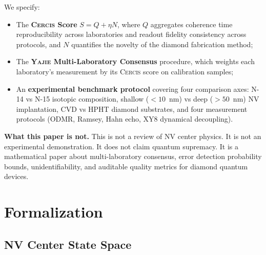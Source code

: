 \documentclass[11pt,a4paper]{article}
\theoremstyle{definition}
\newcommand{\Yajie}{\textsc{Yajie}}
\newcommand{\Cercis}{\textsc{Cercis}}
\newcommand{\NV}{NV}
\newcommand{\ODMR}{ODMR}
\begin{document}
We specify:
\begin{itemize}[nosep]
    \item The \textbf{\Cercis{} Score} $S = Q + \eta N$, where $Q$ aggregates coherence time reproducibility across laboratories and readout fidelity consistency across protocols, and $N$ quantifies the novelty of the diamond fabrication method;
    \item The \textbf{\Yajie{} Multi-Laboratory Consensus} procedure, which weights each laboratory's measurement by its \Cercis{} score on calibration samples;
    \item An \textbf{experimental benchmark protocol} covering four comparison axes: N-14 vs N-15 isotopic composition, shallow ($<10$~nm) vs deep ($>50$~nm) \NV{} implantation, CVD vs HPHT diamond substrates, and four measurement protocols (\ODMR{}, Ramsey, Hahn echo, XY8 dynamical decoupling).
\end{itemize}

\textbf{What this paper is not.} This is not a review of \NV{} center physics. It is not an experimental demonstration. It does not claim quantum supremacy. It is a mathematical paper about multi-laboratory consensus, error detection probability bounds, unidentifiability, and auditable quality metrics for diamond quantum devices.

\section{Formalization }
\label{sec:formalism}

\subsection{NV Center State Space}
\end{document}
